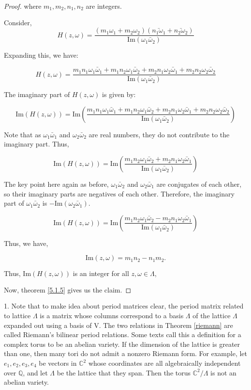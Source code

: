 \begin{remark}
\begin{proof}
where \( m_1, m_2, n_1, n_2 \) are integers. 

Consider, 
\[ H(z, \omega) = \frac{(m_1 \omega_1 + m_2 \omega_2)(\bar{n_1 \omega_1} + \bar{n_2 \omega_2})}{\text{Im}(\omega_1 \bar{\omega}_2)} \]

Expanding this, we have:

\[ H(z, \omega) = \frac{m_1 n_1 \omega_1 \bar{\omega}_1 + m_1 n_2 \omega_1 \bar{\omega}_2 + m_2 n_1 \omega_2 \bar{\omega}_1 + m_2 n_2 \omega_2 \bar{\omega}_2}{\text{Im}(\omega_1 \bar{\omega}_2)} \]

The imaginary part of \( H(z, \omega) \) is given by:

\[ \text{Im}(H(z, \omega)) = \text{Im}\left(\frac{m_1 n_1 \omega_1 \bar{\omega}_1 + m_1 n_2 \omega_1 \bar{\omega}_2 + m_2 n_1 \omega_2 \bar{\omega}_1 + m_2 n_2 \omega_2 \bar{\omega}_2}{\text{Im}(\omega_1 \bar{\omega}_2)}\right) \]

Note that  as \( \omega_1 \bar{\omega}_1 \) and \( \omega_2 \bar{\omega}_2 \) are real numbers, they do not contribute to the imaginary part. Thus,

\[ \text{Im}(H(z, \omega)) = \text{Im}\left(\frac{m_1 n_2 \omega_1 \bar{\omega}_2 + m_2 n_1 \omega_2 \bar{\omega}_1}{\text{Im}(\omega_1 \bar{\omega}_2)}\right) \]

The key point here again as before, \( \omega_1 \bar{\omega}_2 \) and \( \omega_2 \bar{\omega}_1 \) are conjugates of each other, so their imaginary parts are negatives of each other. Therefore, the imaginary part of \( \omega_1 \bar{\omega}_2 \) is \( -\text{Im}(\omega_2 \bar{\omega}_1) \).

\[ \text{Im}(H(z, \omega)) = \text{Im}\left(\frac{m_1 n_2 \omega_1 \bar{\omega}_2 - m_2 n_1 \omega_2 \bar{\omega}_1}{\text{Im}(\omega_1 \bar{\omega}_2)}\right) \]

Thus, we have,

$$\text{Im}(z,\omega)=m_1n_2-n_1m_2.$$

Thus, \( \text{Im}(H(z, \omega)) \) is an integer for all \( z, \omega \in \Lambda \),

Now, theorem \ref{5.1.5} gives us the claim. 
\end{proof}    

\begin{remark}

1. Note that to make idea about period matrices clear, the period matrix related to lattice $\Lambda$ is a matrix whose columns correspond to a basis  $\Lambda$  of the lattice $\Lambda$  expanded out using a basis of V. The two relations in Theorem \ref{riemann} are called Riemann's bilinear period relations. Some texts call this a definition for a complex torus to be an abelian variety. If the dimension of the lattice is greater than one, then many tori do not admit a nonzero Riemann form. For example, let $e_{1}, e_{2}, e_{3}, e_{4}$ be vectors in $\mathbb{C}^{2}$ whose coordinates are all algebraically independent over $\mathbb{Q}$, and let $\Lambda$ be the lattice that they span. Then the torus $\mathbb{C}^{2} / \Lambda$ is not an abelian variety.\\


\end{remark}
\end{remark}
